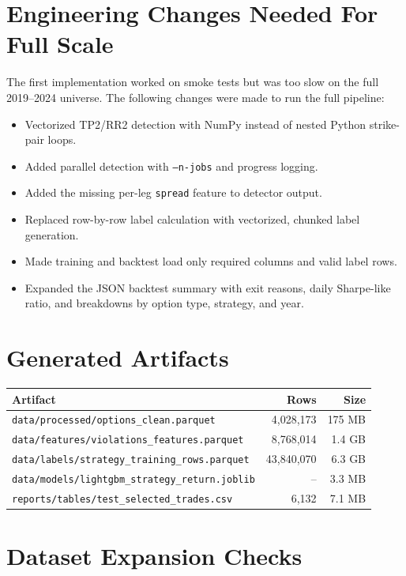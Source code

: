 \documentclass[11pt]{article}
\begin{document}
\section{Engineering Changes Needed For Full Scale}

The first implementation worked on smoke tests but was too slow on the full 2019--2024 universe. The following changes were made to run the full pipeline:

\begin{itemize}
  \item Vectorized TP2/RR2 detection with NumPy instead of nested Python strike-pair loops.
  \item Added parallel detection with \texttt{--n-jobs} and progress logging.
  \item Added the missing per-leg \texttt{spread} feature to detector output.
  \item Replaced row-by-row label calculation with vectorized, chunked label generation.
  \item Made training and backtest load only required columns and valid label rows.
  \item Expanded the JSON backtest summary with exit reasons, daily Sharpe-like ratio, and breakdowns by option type, strategy, and year.
\end{itemize}

\section{Generated Artifacts}

\begin{center}
\begin{tabular}{@{}lrr@{}}
\toprule
Artifact & Rows & Size \\
\midrule
\texttt{data/processed/options\_clean.parquet} & 4,028,173 & 175 MB \\
\texttt{data/features/violations\_features.parquet} & 8,768,014 & 1.4 GB \\
\texttt{data/labels/strategy\_training\_rows.parquet} & 43,840,070 & 6.3 GB \\
\texttt{data/models/lightgbm\_strategy\_return.joblib} & -- & 3.3 MB \\
\texttt{reports/tables/test\_selected\_trades.csv} & 6,132 & 7.1 MB \\
\bottomrule
\end{tabular}
\end{center}

\section{Dataset Expansion Checks}
\end{document}
